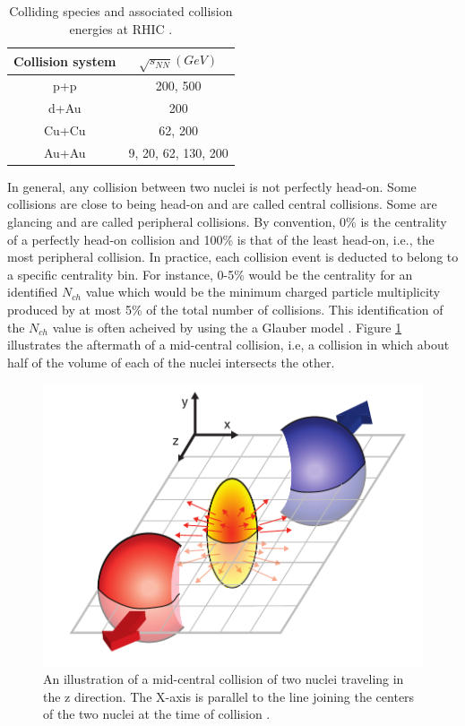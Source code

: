 \begin{table}[h!]
\centering
\begin{tabular}{||c c||}
\hline
Collision system & $\sqrt{s_{NN}}(GeV)$ \\ [0.5ex]
\hline
\hline
p+p & 200, 500 \\
d+Au & 200 \\
Cu+Cu & 62, 200 \\
Au+Au & 9, 20, 62, 130, 200 \\ [1ex]
\hline
\end{tabular}
\caption{Colliding species and associated collision energies at RHIC \cite{phdthesisnattrass}.}
\label{table:RHIC_specs}
\end{table}


In general, any collision between two nuclei is not perfectly head-on. Some collisions are close to being head-on and are called central collisions. Some are glancing and are called peripheral collisions. %
By convention, 0\% is the centrality of a perfectly head-on collision and 100\% is that of the least head-on, i.e., the most peripheral collision. In practice, each collision event is deducted to belong to a specific centrality bin. For instance, 0-5\% would be the centrality for an identified $N_{ch}$ value which would be the minimum charged particle multiplicity produced by at most 5\% of the total number of collisions. This identification of the $N_{ch}$ value is often acheived by using the a Glauber model \cite{Connors:2017ptx,Miller:2007ri}. Figure \ref{fig:mid-central_collision} illustrates the aftermath of a mid-central collision, i.e, a collision in which about half of the volume of each of the nuclei intersects the other.%
	\begin{figure}[h]
	  \centering
	  \includegraphics[width=4.5in]{figures/flow_elliptic_init_v4.pdf}
	  \caption{An illustration of a mid-central collision of two nuclei traveling in the z direction. The X-axis is parallel to the line joining the centers of the two nuclei at the time of collision \cite{Connors:2017ptx}.}\label{fig:mid-central_collision}
	\end{figure}


